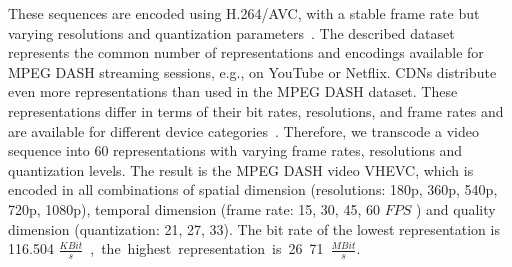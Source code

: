 These sequences are encoded using H.264/AVC, with a stable frame rate but varying resolutions and quantization parameters~\cite{Wiegand2003}.
The described dataset represents the common number of representations and encodings available for \ac{MPEG} \ac{DASH} streaming sessions, e.g., on YouTube or Netflix.
\acp{CDN} distribute even more representations than used in the \ac{MPEG} \ac{DASH} dataset. 
These representations differ in terms of their bit rates, resolutions, and frame rates and are available for different device categories~\cite{Krishnappa2015}.
Therefore, we transcode a video sequence into 60 representations with varying frame rates, resolutions and quantization levels. %
The result is the MPEG DASH video VHEVC, which is encoded in all combinations of spatial dimension (resolutions: 180p, 360p, 540p, 720p, 1080p), temporal dimension (frame rate: 15, 30, 45, 60 $\unit{FPS}$ ) and quality dimension (quantization: 21, 27, 33).
The bit rate of the lowest representation is 116.504 \unit{$\frac{KBit}{s}$}, the highest representation is 26.71 \unit{$\frac{MBit}{s}$}.

